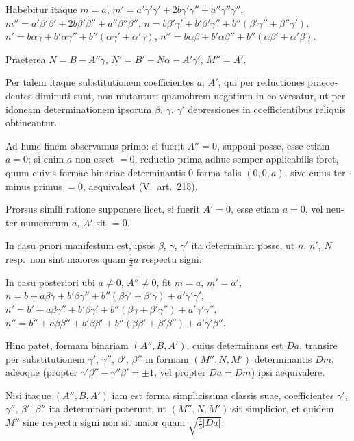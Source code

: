 \documentclass[12pt,a4paper]{article}
\theoremstyle{plain}
\theoremstyle{definition}
\theoremstyle{remark}
\begin{document}
\begin{otherlanguage}{latin}
Habebitur itaque $m = a$, $m' = a'\gamma'\gamma' + 2b\gamma'\gamma'' + a''\gamma''\gamma''$, $m'' = a'\beta'\beta' + 2b\beta'\beta'' + a''\beta''\beta''$, $n = b\beta'\gamma' + b'\beta'\gamma'' + b''(\beta'\gamma'' + \beta''\gamma')$, $n' = b\alpha\gamma + b'\alpha\gamma'' + b''(\alpha\gamma' + \alpha'\gamma)$, $n'' = b\alpha\beta + b'\alpha\beta'' + b''(\alpha\beta' + \alpha'\beta)$.

Praeterea $N = B - A''\gamma$, $N' = B' - N\alpha - A'\gamma'$, $M'' = A'$.

Per talem itaque substitutionem coefficientes $a$, $A'$, qui per reductiones praecedentes diminuti sunt, non mutantur; quamobrem negotium in eo versatur, ut per idoneam determinationem ipsorum $\beta$, $\gamma$, $\gamma'$ depressiones in coefficientibus reliquis obtineantur.

Ad hunc finem observamus primo: si fuerit $A'' = 0$, supponi posse, esse etiam $a = 0$; si enim $a$ non esset $= 0$, reductio prima adhuc semper applicabilis foret, quum cuivis formae binariae determinantis $0$ forma talis $(0, 0, a)$, sive cuius terminus primus $= 0$, aequivaleat (V.\ art.\ 215).

Prorsus simili ratione supponere licet, si fuerit $A' = 0$, esse etiam $a = 0$, vel neuter numerorum $a$, $A'$ sit $= 0$.

In casu priori manifestum est, ipsos $\beta$, $\gamma$, $\gamma'$ ita determinari posse, ut $n$, $n'$, $N$ resp.\ non sint maiores quam $\frac{1}{2}a$ respectu signi.

In casu posteriori ubi $a \neq 0$, $A'' \neq 0$, fit $m = a$, $m' = a'$, $n = b + a\beta\gamma + b'\beta\gamma'' + b''(\beta\gamma' + \beta'\gamma) + a'\gamma'\gamma'$, $n' = b' + a\beta\gamma'' + b'\beta\gamma' + b''(\beta\gamma + \beta'\gamma'') + a'\gamma'\gamma''$, $n'' = b'' + a\beta\beta'' + b'\beta\beta' + b''(\beta\beta' + \beta'\beta'') + a'\gamma'\beta''$.

Hinc patet, formam binariam $(A'', B, A')$, cuius determinans est $Da$, transire per substitutionem $\gamma'$, $\gamma''$, $\beta'$, $\beta''$ in formam $(M'', N, M')$ determinantis $Dm$, adeoque (propter $\gamma'\beta'' - \gamma''\beta' = \pm 1$, vel propter $Da = Dm$) ipsi aequivalere.

Nisi itaque $(A'', B, A')$ iam est forma simplicissima classis suae, coefficientes $\gamma'$, $\gamma''$, $\beta'$, $\beta''$ ita determinari poterunt, ut $(M'', N, M')$ sit simplicior, et quidem $M''$ sine respectu signi non sit maior quam $\sqrt{\frac{4}{3}|Da|}$.


\end{otherlanguage}
\end{document}
